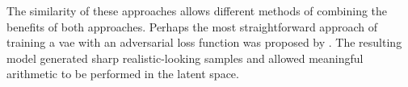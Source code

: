 The similarity of these approaches allows different methods of combining the benefits of both approaches. Perhaps the most straightforward approach of training a \acrshort{vae} with an adversarial loss function was proposed by \textcite{LarsenSW15autoencodingbeyond}. The resulting model generated sharp realistic-looking samples and allowed meaningful arithmetic to be performed in the latent space.


% 
% 
% 

